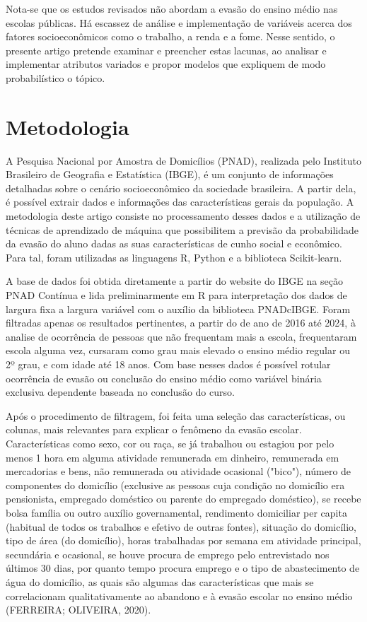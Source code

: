 \documentclass[english, spanish, brazilian]{RBIEarticle} %
\begin{document}
Nota-se que os estudos revisados não abordam a evasão do ensino médio nas escolas públicas. Há escassez de análise e implementação de variáveis acerca dos fatores socioeconômicos como o trabalho, a renda e a fome. Nesse sentido, o presente artigo pretende examinar e preencher estas lacunas, ao analisar e implementar atributos variados e propor modelos que expliquem de modo probabilístico o tópico.

\section{Metodologia}
A Pesquisa Nacional por Amostra de Domicílios (PNAD), realizada pelo Instituto Brasileiro de Geografia e Estatística (IBGE), é um conjunto de informações detalhadas sobre o cenário socioeconômico da sociedade brasileira. A partir dela, é possível extrair dados e informações das características gerais da população. A metodologia deste artigo consiste no processamento desses dados e a utilização de técnicas de aprendizado de máquina que possibilitem a previsão da probabilidade da evasão do aluno dadas as suas características de cunho social e econômico. Para tal, foram utilizadas as linguagens R, Python e a biblioteca Scikit-learn.

A base de dados foi obtida diretamente a partir do website do IBGE na seção PNAD Contínua e lida preliminarmente em R para interpretação dos dados de largura fixa a largura variável com o auxílio da biblioteca PNADcIBGE. Foram filtradas apenas os resultados pertinentes, a partir do de ano de 2016 até 2024, à analise de ocorrência de pessoas que não frequentam mais a escola, frequentaram escola alguma vez, cursaram como grau mais elevado o ensino médio regular ou 2º grau, e com idade até 18 anos. Com base nesses dados é possível rotular ocorrência de evasão ou conclusão do ensino médio como variável binária exclusiva dependente baseada no conclusão do curso.

Após o procedimento de filtragem, foi feita uma seleção das características, ou colunas, mais relevantes para explicar o fenômeno da evasão escolar. Características como sexo, cor ou raça, se já trabalhou ou estagiou por pelo menos 1 hora em alguma atividade remunerada em dinheiro, remunerada em mercadorias e bens, não remunerada ou atividade ocasional ("bico"), número de componentes do domicílio (exclusive as pessoas cuja condição no domicílio era pensionista, empregado doméstico ou parente do empregado doméstico), se recebe bolsa família ou outro auxílio governamental, rendimento domiciliar per capita
(habitual de todos os trabalhos e efetivo de outras fontes), situação do domicílio, tipo de área (do domicílio), horas trabalhadas por semana em atividade principal, secundária e ocasional, se houve procura de emprego pelo entrevistado nos últimos 30 dias, por quanto tempo procura emprego e o tipo de abastecimento de água do domicílio, as quais são algumas das características que mais se correlacionam qualitativamente ao abandono e à evasão escolar no ensino médio (FERREIRA; OLIVEIRA, 2020).
\end{document}
